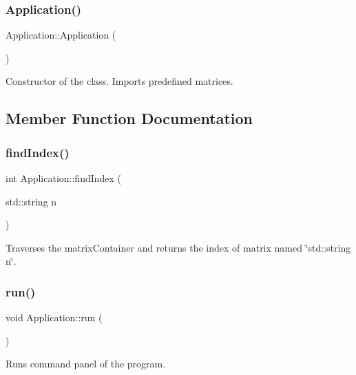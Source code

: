 \subsubsection{\texorpdfstring{Application()}{Application()}}
{\footnotesize\ttfamily Application\+::\+Application (\begin{DoxyParamCaption}{ }\end{DoxyParamCaption})}



Constructor of the class. Imports predefined matrices. 



\subsection{Member Function Documentation}
\mbox{\label{class_application_ae79c4e186a04cb48c284b2a9c6228c8e}} 
\subsubsection{\texorpdfstring{find\+Index()}{findIndex()}}
{\footnotesize\ttfamily int Application\+::find\+Index (\begin{DoxyParamCaption}\item[{std\+::string}]{n }\end{DoxyParamCaption})}



Traverses the matrix\+Container and returns the index of matrix named \char`\"{}std\+::string n\char`\"{}. 

\mbox{\label{class_application_a68965449404743bf1add056784d6cf81}} 
\subsubsection{\texorpdfstring{run()}{run()}}
{\footnotesize\ttfamily void Application\+::run (\begin{DoxyParamCaption}{ }\end{DoxyParamCaption})}



Runs command panel of the program. 

\mbox{\label{class_application_add6aceb17b23990e6867256496183bb1}} 
